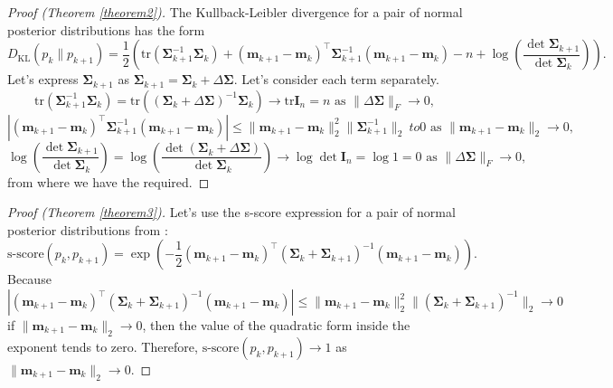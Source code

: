 \documentclass[
11pt,%
tightenlines,%
twoside,%
onecolumn,%
nofloats,%
nobibnotes,%
nofootinbib,%
superscriptaddress,%
noshowpacs,%
centertags]%
{revtex4-2}
\begin{document}
\begin{proof}[Proof (Theorem \ref{theorem2})]
The Kullback-Leibler divergence for a pair of normal posterior distributions has the form
    \[ D_{\text{KL}}\left( p_k \| p_{k+1} \right) = \dfrac{1}{2} \left( \mathrm{tr}\left( \mathbf{\Sigma}_{k+1}^{-1} \mathbf{\Sigma}_k \right) + (\mathbf{m}_{k+1} - \mathbf{m}_k)^{\top} \mathbf{\Sigma}_{k+1}^{-1} (\mathbf{m}_{k+1} - \mathbf{m}_k) - n + \log{\left( \dfrac{\det \mathbf{\Sigma}_{k+1}}{\det \mathbf{\Sigma}_{k}} \right)} \right). \]
    Let's express $\mathbf{\Sigma}_{k+1}$ as $\mathbf{\Sigma}_{k+1} = \mathbf{\Sigma}_k + \Delta\mathbf{\Sigma}$. Let's consider each term separately.
    \[ \mathrm{tr}\left( \mathbf{\Sigma}_{k+1}^{-1} \mathbf{\Sigma}_k \right) = \mathrm{tr}\left(\left(\mathbf{\Sigma}_k + \Delta \mathbf{\Sigma} \right)^{-1} \mathbf{\Sigma}_k \right) \to \mathrm{tr}\mathbf{I}_n=n\text{ as } \| \Delta \mathbf{\Sigma} \|_F \to 0, \]
    \[ \left| (\mathbf{m}_{k+1} - \mathbf{m}_k)^{\top}\mathbf{\Sigma}_{k+1}^{-1} (\mathbf{m}_{k+1} - \mathbf{m}_k) \right| \leqslant\| \mathbf{m}_{k+1} -\mathbf{m}_k\|_2^2\|\mathbf{\Sigma}_{k+1}^{-1} \|_2 \ to 0 \text{ as } \| \mathbf{m}_{k+1} - \mathbf{m}_k\|_2 \to 0, \]
    \[ \log{\left( \dfrac{\det \mathbf{\Sigma}_{k+1}}{\det \mathbf{\Sigma}_{k}} \right)} = \log{\left( \dfrac{\det \left( \mathbf{\Sigma}_k + \Delta \mathbf{\Sigma} \right)}{\det\mathbf{\Sigma}_{k}} \right)} \to \log \det\mathbf{I}_n = \log 1 = 0 \text{ as } \| \Delta \mathbf{\Sigma} \|_F\to 0, \]
    from where we have the required.
\end{proof}

\begin{proof}[Proof (Theorem \ref{theorem3})]
Let's use the s-score expression for a pair of normal posterior distributions from \cite{Aduenko2017}:
\[\text{s-score}(p_k, p_{k+1}) = \exp{\left( -\dfrac{1}{2} (\mathbf{m}_{k+1} - \mathbf{m}_k)^{\top} \left( \mathbf{\Sigma}_k + \mathbf{\Sigma}_{k+1} \right)^{-1} (\mathbf{m}_{k+1} - \mathbf{m}_k) \right)}. \]
Because
    \[ \left| (\mathbf{m}_{k+1} - \mathbf{m}_k)^{\top} \left( \mathbf{\Sigma}_k + \mathbf{\Sigma}_{k+1} \right)^{-1} (\mathbf{m}_{k+1} - \mathbf{m}_k) \right| \leqslant \| \mathbf{m}_{k+1} - \mathbf{m}_k \|_2^2 \| \left( \mathbf{\Sigma}_k + \mathbf{\Sigma}_{k+1} \right)^{-1} \|_2 \to 0 \]
    if $\|\mathbf{m}_{k+1} - \mathbf{m}_k\|_2\to 0$, then the value of the quadratic form inside the exponent tends to zero. Therefore, $\text{s-score}(p_k, p_{k+1}) \to 1$ as $\|\mathbf{m}_{k+1} - \mathbf{m}_k\|_2\to 0$.
\end{proof}
\end{document}
